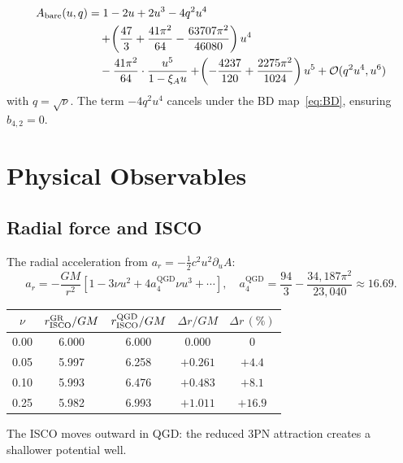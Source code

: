 \documentclass[11pt,a4paper]{article}
\theoremstyle{plain}
\theoremstyle{definition}
\theoremstyle{remark}
\newcommand{\GR}{\mathrm{GR}}
\newcommand{\bA}{\mathrm{bare}}
\newcommand{\QGD}{\mathrm{QGD}}
\newcommand{\xiA}{\xi_A}
\begin{document}
\begin{tcolorbox}[colback=boxorange,colframe=borderorange,
  title={\bfseries Corresponding bare potential in amplitude variables}]
\begin{align}
  A_{\bA}(u,q)
  &= 1 - 2u + 2u^3 - 4q^2 u^4 \notag\\
  &\quad + \!\left(\frac{47}{3}+\frac{41\pi^2}{64}
    -\frac{63707\pi^2}{46080}\right)u^4 \notag\\
  &\quad - \frac{41\pi^2}{64}\cdot\frac{u^5}{1-\xiA u}
  + \!\left(-\frac{4237}{120}+\frac{2275\pi^2}{1024}\right)u^5
  + \mathcal{O}(q^2 u^4, u^6)
\end{align}
with $q=\sqrt{\nu}$.  The term $-4q^2u^4$ cancels under the BD
map~\eqref{eq:BD}, ensuring $b_{4,2}=0$.
\end{tcolorbox}

\section{Physical Observables}
\label{sec:obs}

\subsection{Radial force and ISCO}

The radial acceleration from $a_r = -\frac{1}{2}c^2 u^2\partial_u A$:
\begin{equation}
  a_r = -\frac{GM}{r^2}\!\left[
    1 - 3\nu u^2 + 4a_4^{\QGD}\nu u^3 + \cdots
  \right],
  \quad a_4^{\QGD} = \frac{94}{3}-\frac{34{,}187\pi^2}{23{,}040}
  \approx 16.69.
\end{equation}

\begin{center}
\renewcommand{\arraystretch}{1.3}
\begin{tabular}{ccccc}
\toprule
$\nu$ & $r_{\rm ISCO}^{\GR}/GM$ & $r_{\rm ISCO}^{\QGD}/GM$
  & $\Delta r/GM$ & $\Delta r\,(\%)$ \\
\midrule
0.00 & 6.000 & 6.000 & 0.000 & 0 \\
0.05 & 5.997 & 6.258 & $+0.261$ & $+4.4$ \\
0.10 & 5.993 & 6.476 & $+0.483$ & $+8.1$ \\
0.25 & 5.982 & 6.993 & $+1.011$ & $+16.9$ \\
\bottomrule
\end{tabular}
\end{center}
The ISCO moves outward in QGD: the reduced 3PN attraction
creates a shallower potential well.
\end{document}
